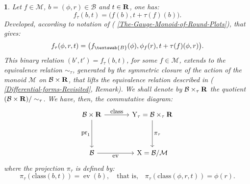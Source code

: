 \documentclass[12pt,reqno]{amsart}
\theoremstyle{article}
\newtheorem{article}{}
\newcommand{\art}[1]{(\text{\textsection} \ref{#1})}
\newcommand{\xart}[2]{(\text{\textsection} \ref{#1}, #2)}
\def \X{\mathrm X}
\def \Y{\mathrm Y}
\newcommand{\RR}{{\bf R}}
\newcommand{\cB}{{\mathcal B}}
\newcommand{\cM}{\mathcal{M}}
\newcommand{\fB}{\textswab{B}}
\newcommand{\class}{\mathrm{class}}
\DeclareMathOperator{\ev}{ev}
\newcommand{\pr}{{\rm pr}}
\begin{document}
\begin{article}
    Let $f \in \cM$,
    $b=(\phi,r) \in \cB$ and $t \in \RR$,
    one has:
    $$
    f_\tau(b,t) = \big(f(b), t + \tau(f)(b)\big).
    $$
    Developed,
    according to notation of \art{The-Gauge-Monoid-of-Round-Plots},
    that gives:
    $$
    f_\tau(\phi,r,t) = \big(f_\fB(\phi), \phi_f(r), t + \tau(f)(\phi,r)\big).
    $$
    This binary relation $(b',t') = f_\tau(b,t)$,
    for some $f \in \cM$,
    extends to the equivalence relation $\sim_\tau$,
    generated by the symmetric closure of the action of the monoid $\cM$ on $\cB \times \RR$,
    that lifts the equivalence relation described in \xart{Differential-forms-Revisited}{Remark}.
    We shall denote by $\cB \times_\tau \RR$ the quotient $(\cB \times \RR)/ \sim_\tau$.
    We have,
    then,
    the commutative diagram:
    $$
    \begin{tikzcd}[column sep=large,every label/.append style = {font = \small}]
      \cB \times \RR  \arrow[r, "\class"] \arrow[d, swap, "\pr_1"]  & \Y_\tau = \cB \times_\tau \RR \arrow[d, "\pi_\tau"] \\[.75cm]
      \cB \arrow[r, swap, "\ev"]                                    & \X = \cB/\cM
    \end{tikzcd}
    $$
    where the projection $\pi_\tau$ is defined by:
    $$
    \pi_\tau(\class(b,t)) = \ev(b),
    \quad\text{that is,}\quad
    \pi_\tau(\class(\phi,r,t)) = \phi(r).
    $$
    

\end{article}
\end{document}
